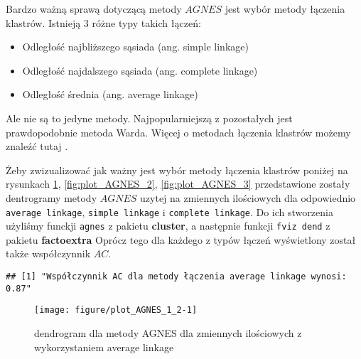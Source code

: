 \documentclass[12pt, a4paper]{article}\usepackage[]{graphicx}\usepackage[]{xcolor}
\makeatletter
\def\maxwidth{ %
  \ifdim\Gin@nat@width>\linewidth
    \linewidth
  \else
    \Gin@nat@width
  \fi
}
\newenvironment{kframe}{%
 \def\at@end@of@kframe{}%
 \ifinner\ifhmode%
  \def\at@end@of@kframe{\end{minipage}}%
  \begin{minipage}{\columnwidth}%
 \fi\fi%
 \def\FrameCommand##1{\hskip\@totalleftmargin \hskip-\fboxsep
 \colorbox{shadecolor}{##1}\hskip-\fboxsep
     \hskip-\linewidth \hskip-\@totalleftmargin \hskip\columnwidth}%
 \MakeFramed {\advance\hsize-\width
   \@totalleftmargin\z@ \linewidth\hsize
   \@setminipage}}%
 {\par\unskip\endMakeFramed%
 \at@end@of@kframe}
\newenvironment{knitrout}{}{} %
\makeatother
\begin{document}
\par Bardzo ważną sprawą dotyczącą metody $AGNES$ jest wybór metody łączenia klastrów. Istnieją $3$ różne typy takich łączeń:
\begin{itemize}
\item Odległość najbliższego sąsiada (ang. simple linkage)
\item Odległość najdalszego sąsiada (ang. complete linkage)
\item Odległość średnia (ang. average linkage)
\end{itemize}
Ale nie są to jedyne metody. Najpopularniejszą z pozostałych jest prawdopodobnie metoda Warda. Więcej o metodach łączenia klastrów możemy znaleźć tutaj \cite{linkage}.
\par Żeby zwizualizować jak ważny jest wybór metody łączenia klastrów poniżej na rysunkach \ref{fig:plot_AGNES_1.2}, \ref{fig:plot_AGNES_2}, \ref{fig:plot_AGNES_3} przedstawione zostały dentrogramy metody $AGNES$ uzytej na zmiennych ilościowych dla odpowiednio \texttt{average linkage}, \texttt{simple linkage} i \texttt{complete linkage}. Do ich stworzenia użyliśmy funckji \texttt{agnes} \cite{agnes} z pakietu \textbf{cluster}, a następnie funkcji \texttt{fviz dend} \cite{fvizdend} z pakietu \textbf{factoextra} Oprócz tego dla każdego z typów łączeń wyświetlony został także współczynnik $AC$.

\begin{knitrout}
\color{fgcolor}\begin{kframe}
\begin{verbatim}
## [1] "Współczynnik AC dla metody łączenia average linkage wynosi: 0.87"
\end{verbatim}
\end{kframe}\begin{figure}[H]

{\centering \texttt{[image: figure/plot\_AGNES\_1\_2-1]} 

}

\caption[dendrogram dla metody AGNES dla zmiennych ilościowych z wykorzystaniem average linkage]{dendrogram dla metody AGNES dla zmiennych ilościowych z wykorzystaniem average linkage}\label{fig:plot_AGNES_1.2}
\end{figure}

\end{knitrout}

\newpage
\end{document}
